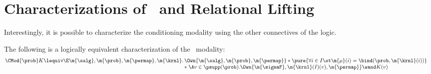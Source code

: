 \section{Characterizations of \SuperCond\ and Relational Lifting}
\label{sec:appendix:alt-cond-rl}

Interestingly, it is possible to characterize the conditioning modality
using the other connectives of the logic.
\begin{proposition}
\label{prop:cond-as-wand}
  The following is a logically equivalent characterization
  of the \supercond\ modality:
  \begin{align*}
    \CMod{\prob} K &\lequiv
    \begin{array}[t]{@{}r@{\,}l@{}}
      \E \m{\salg}, \m{\prob}, \m{\permap}, \m{\krnl}.
        & \Own{\m{\salg}, \m{\prob}, \m{\permap}} *
        \pure{\forall i\in I\st
        \m{\mu}(i) = \bind(\prob, \m{\krnl}(i))}
     \\ & * \;
     \A v \in \psupp(\prob).
     \Own{\m{\sigmaF}, \m{\krnl}(I)(v), \m{\permap}}
     \wand
     K(v)
    \end{array}
\end{align*}
\end{proposition}


